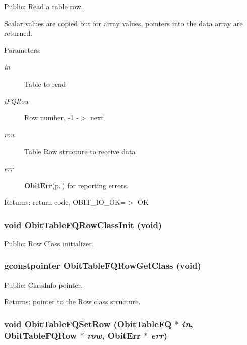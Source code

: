 Public: Read a table row. 

Scalar values are copied but for array values, pointers into the data array are returned. \begin{Desc}
\item[Parameters:]
\begin{description}
\item[{\em in}]Table to read \item[{\em i\-FQRow}]Row number, -1 -$>$ next \item[{\em row}]Table Row structure to receive data \item[{\em err}]{\bf Obit\-Err}{\rm (p.\,\pageref{structObitErr})} for reporting errors. \end{description}
\end{Desc}
\begin{Desc}
\item[Returns:]return code, OBIT\_\-IO\_\-OK=$>$ OK \end{Desc}
\subsubsection{\setlength{\rightskip}{0pt plus 5cm}void Obit\-Table\-FQRow\-Class\-Init (void)}\label{ObitTableFQ_8h_a7}


Public: Row Class initializer. 

\subsubsection{\setlength{\rightskip}{0pt plus 5cm}gconstpointer Obit\-Table\-FQRow\-Get\-Class (void)}\label{ObitTableFQ_8h_a9}


Public: Class\-Info pointer. 

\begin{Desc}
\item[Returns:]pointer to the Row class structure. \end{Desc}
\subsubsection{\setlength{\rightskip}{0pt plus 5cm}void Obit\-Table\-FQSet\-Row ({\bf Obit\-Table\-FQ} $\ast$ {\em in}, {\bf Obit\-Table\-FQRow} $\ast$ {\em row}, {\bf Obit\-Err} $\ast$ {\em err})}\label{ObitTableFQ_8h_a19}


